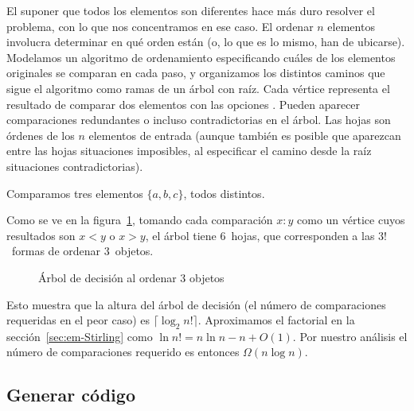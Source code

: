   El suponer que todos los elementos son diferentes
  hace más duro resolver el problema,
  con lo que nos concentramos en ese caso.
  El ordenar \(n\) elementos involucra determinar en qué orden están
  (o, lo que es lo mismo, han de ubicarse).
  Modelamos un algoritmo de ordenamiento
  especificando cuáles de los elementos originales
  se comparan en cada paso,
  y organizamos los distintos caminos que sigue el algoritmo
  como ramas de un árbol con raíz.
  Cada vértice representa
  el resultado de comparar dos elementos con las opciones \(<,>\).
  Pueden aparecer comparaciones redundantes
  o incluso contradictorias en el árbol.
  Las hojas son órdenes de los \(n\) elementos de entrada
  (aunque también es posible que aparezcan entre las hojas
   situaciones imposibles,
   al especificar el camino desde la raíz
   situaciones contradictorias).

  \begin{example}
    Comparamos tres elementos \(\{a, b, c\}\),
    todos distintos.

    Como se ve en la figura~\ref{fig:arbol_decision},
    tomando cada comparación \(x \colon y\) como un vértice
    cuyos resultados son \(x < y\) o \(x > y\),
    el árbol tiene \(6\)~hojas,
    que corresponden a las \(3!\)~formas de ordenar \(3\)~objetos.
    \begin{figure}[htbp]
      \centering
      \caption{Árbol de decisión al ordenar $3$ objetos}
      \label{fig:arbol_decision}
    \end{figure}
  \end{example}
  Esto muestra que la altura del árbol de decisión
  (el número de comparaciones requeridas en el peor caso)
  es \(\lceil \log_2 n! \rceil\).
  Aproximamos el factorial en la sección~\ref{sec:em-Stirling}
  como \(\ln n! = n \ln n - n + O(1)\).
  Por nuestro análisis
  el número de comparaciones requerido
  es entonces \(\Omega(n \log n)\).

\subsection{Generar código}
\label{sec:Sethi-Ullman}


